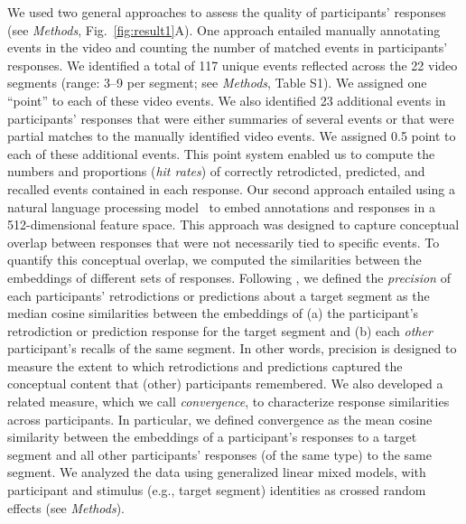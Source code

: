 \documentclass[10pt]{article}
\newcommand{\stimDescription}{S1} %
\begin{document}
We used two general approaches to assess the quality of participants' responses (see \textit{Methods}, Fig.~\ref{fig:result1}A).  One approach entailed manually annotating events in the video and counting the number of matched events in participants' responses.  We identified a total of 117 unique events reflected across the 22 video segments (range: 3--9 per segment; see \textit{Methods}, Table \stimDescription).  We assigned one ``point'' to each of these video events.  We also identified 23 additional events in participants' responses that were either summaries of several events or that were partial matches to the manually identified video events.  We assigned 0.5 point to each of these additional events.  This point system enabled us to compute the numbers and proportions (\textit{hit rates}) of correctly retrodicted, predicted, and recalled events contained in each response.  Our second approach entailed using a natural language processing model~\citep{CerEtal18} to embed annotations and responses in a 512-dimensional feature space.  This approach was designed to capture conceptual overlap between responses that were not necessarily tied to specific events.  To quantify this conceptual overlap, we computed the similarities between the embeddings of different sets of responses.  Following \cite{HeusEtal21}, we defined the \textit{precision} of each participants' retrodictions or predictions about a target segment as the median cosine similarities between the embeddings of (a) the participant's retrodiction or prediction response for the target segment and (b) each \textit{other} participant's recalls of the same segment.  In other words, precision is designed to measure the extent to which retrodictions and predictions captured the conceptual content that (other) participants remembered.  We also developed a related measure, which we call \textit{convergence}, to characterize response similarities across participants.  In particular, we defined convergence as the mean cosine similarity between the embeddings of a participant's responses to a target segment and all other participants' responses (of the same type) to the same segment.  We analyzed the data using generalized linear mixed models, with participant and stimulus (e.g., target segment) identities as crossed random effects (see \textit{Methods}).
\end{document}
